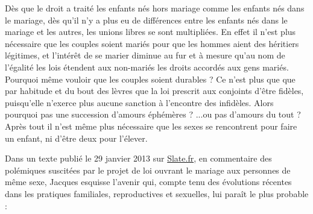  Dès que le droit a traité les enfants nés hors mariage comme les enfants nés dans le mariage, dès qu'il n'y a plus eu de différences entre les enfants nés dans le mariage et les autres, les unions libres se sont multipliées. En effet il n'est plus nécessaire que les couples soient mariés pour que les hommes aient des héritiers légitimes, et l'intérêt de se marier diminue au fur et à mesure qu'au nom de l'égalité les lois étendent aux non-mariés les droits accordés aux gens mariés. Pourquoi même vouloir que les couples soient durables ? Ce n'est plus que que par habitude et du bout des lèvres que la loi prescrit aux conjoints d'être fidèles, puisqu'elle n'exerce plus aucune sanction à l'encontre des infidèles. Alors pourquoi pas une succession d'amours éphémères ?  ...ou pas d'amours du tout ? Après tout il n'est même plus nécessaire que les sexes se rencontrent pour faire un enfant, ni d'être deux pour l'élever. 



Dans un texte publié le 29 janvier 2013 sur \href{http://www.slate.fr}{Slate.fr}, en commentaire des polémiques suscitées par le projet de loi ouvrant le mariage aux personnes de même sexe, Jacques  esquisse l'avenir qui, compte tenu des évolutions récentes dans les pratiques familiales, reproductives et sexuelles, lui paraît le plus probable  : 

